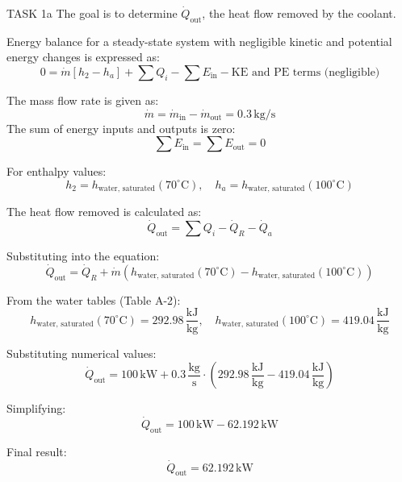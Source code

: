 TASK 1a  
The goal is to determine \( \dot{Q}_{\text{out}} \), the heat flow removed by the coolant.  

Energy balance for a steady-state system with negligible kinetic and potential energy changes is expressed as:  
\[
0 = \dot{m} \left[ h_2 - h_a \right] + \sum Q_i - \sum E_{\text{in}} - \text{KE and PE terms (negligible)}  
\]  

The mass flow rate is given as:  
\[
\dot{m} = \dot{m}_{\text{in}} - \dot{m}_{\text{out}} = 0.3 \, \text{kg/s}  
\]  
The sum of energy inputs and outputs is zero:  
\[
\sum E_{\text{in}} = \sum E_{\text{out}} = 0  
\]  

For enthalpy values:  
\[
h_2 = h_{\text{water, saturated}}(70^\circ\text{C}), \quad h_a = h_{\text{water, saturated}}(100^\circ\text{C})  
\]  

The heat flow removed is calculated as:  
\[
\dot{Q}_{\text{out}} = \sum Q_i - \dot{Q}_R - \dot{Q}_a  
\]  

Substituting into the equation:  
\[
\dot{Q}_{\text{out}} = \dot{Q}_R + \dot{m} \left( h_{\text{water, saturated}}(70^\circ\text{C}) - h_{\text{water, saturated}}(100^\circ\text{C}) \right)  
\]  

From the water tables (Table A-2):  
\[
h_{\text{water, saturated}}(70^\circ\text{C}) = 292.98 \, \frac{\text{kJ}}{\text{kg}}, \quad h_{\text{water, saturated}}(100^\circ\text{C}) = 419.04 \, \frac{\text{kJ}}{\text{kg}}  
\]  

Substituting numerical values:  
\[
\dot{Q}_{\text{out}} = 100 \, \text{kW} + 0.3 \, \frac{\text{kg}}{\text{s}} \cdot \left( 292.98 \, \frac{\text{kJ}}{\text{kg}} - 419.04 \, \frac{\text{kJ}}{\text{kg}} \right)  
\]  

Simplifying:  
\[
\dot{Q}_{\text{out}} = 100 \, \text{kW} - 62.192 \, \text{kW}  
\]  

Final result:  
\[
\dot{Q}_{\text{out}} = 62.192 \, \text{kW}  
\]